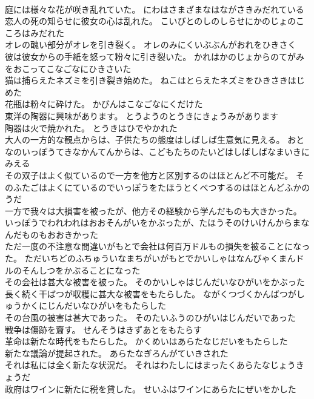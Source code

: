 \documentclass[8pt]{extreport}
\begin{document}
\begin{CJK}{UTF8}{min}
\\	庭には様々な花が咲き乱れていた。	にわはさまざまなはながさきみだれている 
\\	恋人の死の知らせに彼女の心は乱れた。	こいびとのしのしらせにかのじょのこころはみだれた 
\\	オレの醜い部分がオレを引き裂く。	オレのみにくいぶぶんがおれをひきさく 
\\	彼は彼女からの手紙を怒って粉々に引き裂いた。	かれはかのじょからのてがみをおこってこなごなにひきさいた 
\\	猫は捕らえたネズミを引き裂き始めた。	ねこはとらえたネズミをひきさきはじめた 
\\	花瓶は粉々に砕けた。	かびんはこなごなにくだけた 
\\	東洋の陶器に興味があります。	とうようのとうきにきょうみがあります 
\\	陶器は火で焼かれた。	とうきはひでやかれた 
\\	大人の一方的な観点からは、子供たちの態度はしばしば生意気に見える。	おとなのいっぽうてきなかんてんからは、こどもたちのたいどはしばしばなまいきにみえる 
\\	その双子はよく似ているので一方を他方と区別するのはほとんど不可能だ。	そのふたごはよくにているのでいっぽうをたほうとくべつするのはほとんどふかのうだ 
\\	一方で我々は大損害を被ったが、他方その経験から学んだものも大きかった。	いっぽうでわれわれはおおそんがいをかぶったが、たほうそのけいけんからまなんだものもおおきかった 
\\	ただ一度の不注意な間違いがもとで会社は何百万ドルもの損失を被ることになった。	ただいちどのふちゅういなまちがいがもとでかいしゃはなんびゃくまんドルのそんしつをかぶることになった 
\\	その会社は甚大な被害を被った。	そのかいしゃはじんだいなひがいをかぶった 
\\	長く続く干ばつが収穫に甚大な被害をもたらした。	ながくつづくかんばつがしゅうかくにじんだいなひがいをもたらした 
\\	その台風の被害は甚大であった。	そのたいふうのひがいはじんだいであった 
\\	戦争は傷跡を齎す。	せんそうはきずあとをもたらす 
\\	革命は新たな時代をもたらした。	かくめいはあらたなじだいをもたらした 
\\	新たな議論が提起された。	あらたなぎろんがていきされた 
\\	それは私には全く新たな状況だ。	それはわたしにはまったくあらたなじょうきょうだ 
\\	政府はワインに新たに税を貸した。	せいふはワインにあらたにぜいをかした 

\end{CJK}
\end{document}
